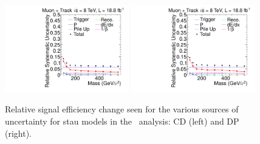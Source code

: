 \begin{figure}[ht]
\centering
  \includegraphics[clip=false, trim=0.0cm 0cm 0.0cm 0cm, width=0.48\textwidth]{figures/tkmu/MuGMStauUncertainty}
  \includegraphics[clip=false, trim=0.0cm 0cm 0.0cm 0cm, width=0.48\textwidth]{figures/tkmu/MuPPStauUncertainty} \\
\caption[Relative signal efficiency change seen for the various sources of uncertainty for stau models in the \tktof\ analysis]
{Relative signal efficiency change seen for the various sources of uncertainty for stau models in the \tktof\ analysis: CD (left) and DP (right).
}
    \label{fig:TkMuStauUncSource}
\end{figure}

